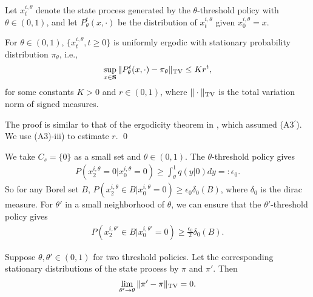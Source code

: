 \documentclass[graybox]{svmult}
\def\bS{{\bf S}}
\begin{document}
Let $x_t^{i,\theta}$ denote the state process generated by the $\theta$-threshold policy  with  $\theta\in (0, 1)$, and let $P_\theta^t(x, \cdot)$ be the distribution of $x_t^{i,\theta}$
 given $x_0^{i,\theta}=x$.


\begin{lemma} \label{lemma:erg}
For $\theta\in (0, 1)$,  $\{x_t^{i,\theta}, t\ge 0\}$
is uniformly ergodic  with stationary probability distribution $\pi_\theta$, i.e.,
\begin{align}
\sup_{x\in \bS}\|P_\theta^t(x, \cdot)
-\pi_\theta\|_{\rm TV}\le K r^t, \label{ppit}
\end{align}
for some constants $K>0$ and $r\in (0, 1)$,
where $\|\cdot\|_{\rm TV}$ is the total variation norm of signed measures.
\end{lemma}

\proof The proof is similar to that of the ergodicity
theorem in \cite{HM16Chen}, which assumed (A3$^\prime$).
We use (A3)-iii) to estimate $r$. \qed


We  take $C_s=\{0\}$ as a small set and $\theta\in (0, 1)$. The $\theta$-threshold policy gives
\begin{align}
P(x_2^{i,\theta}=0|x_0^{i,\theta}=0) \ge\int_\theta^1 q(y|0)dy =:  \epsilon_0. \label{se0}
\end{align}
So for any Borel set  $B$,
$ P(x_2^{i,\theta}\in B|x_0^{i,\theta}=0)\ge \epsilon_0 \delta_0(B)$, where $\delta_0$ is the dirac measure. For $\theta'$ in a small neighborhood of $\theta$, we can ensure that the $\theta'$-threshold policy gives
\begin{align}
P(x_2^{i,\theta'}\in B|x_0^{i,\theta'}=0)\ge \frac{\epsilon_0}{2} \delta_0(B). \label{se0p}
\end{align}



\begin{lemma} \label{lemma:sipi}
Suppose $\theta, \theta'\in (0,1)$ for two threshold policies.
 Let the corresponding stationary distributions of the state process by  $\pi$ and $\pi'$.
Then
$$
\lim_{\theta'\to \theta}\|\pi'-\pi\|_{\rm TV}=0.
$$
\end{lemma}
\end{document}
